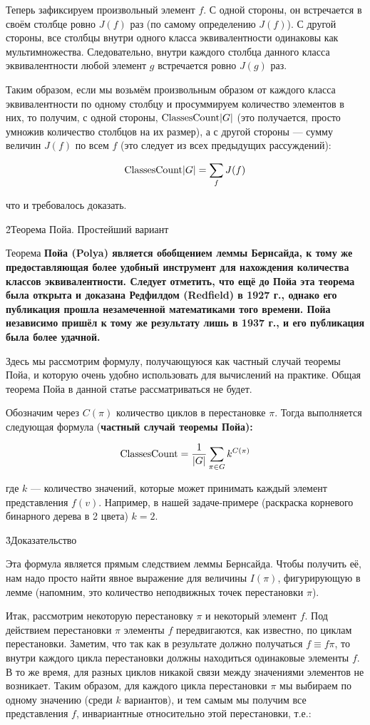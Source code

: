 Теперь зафиксируем произвольный элемент $f$. С одной стороны, он встречается в своём столбце ровно $J(f)$ раз (по самому определению $J(f)$). С другой стороны, все столбцы внутри одного класса эквивалентности одинаковы как мультимножества. Следовательно, внутри каждого столбца данного класса эквивалентности любой элемент $g$ встречается ровно $J(g)$ раз.

Таким образом, если мы возьмём произвольным образом от каждого класса эквивалентности по одному столбцу и просуммируем количество элементов в них, то получим, с одной стороны, ${\rm ClassesCount} |G|$ (это получается, просто умножив количество столбцов на их размер), а с другой стороны --- сумму величин $J(f)$ по всем $f$ (это следует из всех предыдущих рассуждений):

$$ {\rm ClassesCount} |G| = \sum_{f} J(f) $$

что и требовалось доказать.

\h2{Теорема Пойа. Простейший вариант}

Теорема \bf{Пойа} (Polya) является обобщением леммы Бернсайда, к тому же предоставляющая более удобный инструмент для нахождения количества классов эквивалентности. Следует отметить, что ещё до Пойа эта теорема была открыта и доказана Редфилдом (Redfield) в 1927 г., однако его публикация прошла незамеченной математиками того времени. Пойа независимо пришёл к тому же результату лишь в 1937 г., и его публикация была более удачной.

Здесь мы рассмотрим формулу, получающуюся как частный случай теоремы Пойа, и которую очень удобно использовать для вычислений на практике. Общая теорема Пойа в данной статье рассматриваться не будет.

Обозначим через $C(\pi)$ количество циклов в перестановке $\pi$. Тогда выполняется следующая формула (\bf{частный случай теоремы Пойа}):

$$ {\rm ClassesCount} = \frac{1}{|G|} \sum_{\pi \in G} k^{ C(\pi) } $$

где $k$ --- количество значений, которые может принимать каждый элемент представления $f(v)$. Например, в нашей задаче-примере (раскраска корневого бинарного дерева в 2 цвета) $k = 2$.

\h3{Доказательство}

Эта формула является прямым следствием леммы Бернсайда. Чтобы получить её, нам надо просто найти явное выражение для величины $I(\pi)$, фигурирующую в лемме (напомним, это количество неподвижных точек перестановки $\pi$).

Итак, рассмотрим некоторую перестановку $\pi$ и некоторый элемент $f$. Под действием перестановки $\pi$ элементы $f$ передвигаются, как известно, по циклам перестановки. Заметим, что так как в результате должно получаться $f \equiv f \pi$, то внутри каждого цикла перестановки должны находиться одинаковые элементы $f$. В то же время, для разных циклов никакой связи между значениями элементов не возникает. Таким образом, для каждого цикла перестановки $\pi$ мы выбираем по одному значению (среди $k$ вариантов), и тем самым мы получим все представления $f$, инвариантные относительно этой перестановки, т.е.:

